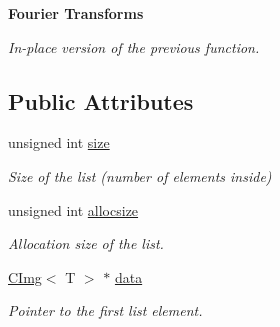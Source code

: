 \begin{Indent}{\bf Fourier Transforms}
\begin{DoxyCompactItemize}
\begin{DoxyCompactList}\small\item\em In-\/place version of the previous function. \end{DoxyCompactList}\end{DoxyCompactItemize}
\end{Indent}
\subsection*{Public Attributes}
\begin{DoxyCompactItemize}
\item 
\hypertarget{structcimg__library_1_1_c_img_list_aa445f53f3fc891f1018c570706911a6e}{unsigned int \hyperlink{structcimg__library_1_1_c_img_list_aa445f53f3fc891f1018c570706911a6e}{size}}\label{structcimg__library_1_1_c_img_list_aa445f53f3fc891f1018c570706911a6e}

\begin{DoxyCompactList}\small\item\em Size of the list (number of elements inside) \end{DoxyCompactList}\item 
\hypertarget{structcimg__library_1_1_c_img_list_a29a33badac3960de364970bbd7294e76}{unsigned int \hyperlink{structcimg__library_1_1_c_img_list_a29a33badac3960de364970bbd7294e76}{allocsize}}\label{structcimg__library_1_1_c_img_list_a29a33badac3960de364970bbd7294e76}

\begin{DoxyCompactList}\small\item\em Allocation size of the list. \end{DoxyCompactList}\item 
\hypertarget{structcimg__library_1_1_c_img_list_a7c484b0bb0c2c5d1d42626d932f85f78}{\hyperlink{structcimg__library_1_1_c_img}{C\-Img}$<$ T $>$ $\ast$ \hyperlink{structcimg__library_1_1_c_img_list_a7c484b0bb0c2c5d1d42626d932f85f78}{data}}\label{structcimg__library_1_1_c_img_list_a7c484b0bb0c2c5d1d42626d932f85f78}

\begin{DoxyCompactList}\small\item\em Pointer to the first list element. \end{DoxyCompactList}\end{DoxyCompactItemize}
